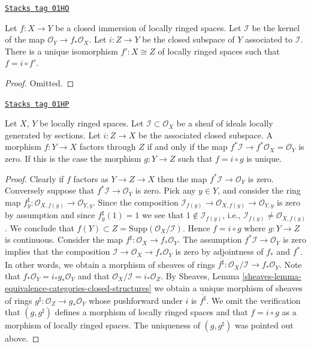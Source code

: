 \begin{lemma}
\label{schemes-lemma-closed-immersion}
\href{https://stacks.math.columbia.edu/tag/01HO}{\texttt{Stacks tag 01HO}}

Let $f : X \to Y$ be a closed immersion of
locally ringed spaces. Let $\mathcal{I}$ be the
kernel of the map $\mathcal{O}_Y \to f_*\mathcal{O}_X$.
Let $i : Z \to Y$ be the closed subspace of $Y$
associated to $\mathcal{I}$.
There is a unique isomorphism $f' : X \cong Z$ of
locally ringed spaces such that $f = i \circ f'$.
\end{lemma}

\begin{proof}
Omitted.
\end{proof}

\begin{lemma}
\label{schemes-lemma-characterize-closed-subspace}
\href{https://stacks.math.columbia.edu/tag/01HP}{\texttt{Stacks tag 01HP}}

Let $X$, $Y$ be locally ringed spaces. Let
$\mathcal{I} \subset \mathcal{O}_X$ be a sheaf of ideals locally generated
by sections. Let $i : Z \to X$ be the associated closed subspace.
A morphism $f : Y \to X$ factors through $Z$ if and only if the map
$f^*\mathcal{I} \to f^*\mathcal{O}_X = \mathcal{O}_Y$
is zero. If this is the case the morphism $g : Y \to Z$
such that $f = i \circ g$ is unique.
\end{lemma}

\begin{proof}
Clearly if $f$ factors as $Y \to Z \to X$ then the map
$f^*\mathcal{I} \to \mathcal{O}_Y$ is zero. Conversely
suppose that $f^*\mathcal{I} \to \mathcal{O}_Y$ is zero.
Pick any $y \in Y$, and consider the ring map
$f^\sharp_y : \mathcal{O}_{X, f(y)} \to \mathcal{O}_{Y, y}$.
Since the composition
$\mathcal{I}_{f(y)} \to \mathcal{O}_{X, f(y)} \to \mathcal{O}_{Y, y}$
is zero by assumption and since $f^\sharp_y(1) = 1$
we see that $1 \not \in \mathcal{I}_{f(y)}$, i.e.,
$\mathcal{I}_{f(y)} \not = \mathcal{O}_{X, f(y)}$. We conclude that
$f(Y) \subset Z = \text{Supp}(\mathcal{O}_X/\mathcal{I})$.
Hence $f = i \circ g$ where $g : Y \to Z$ is continuous.
Consider the map $f^\sharp : \mathcal{O}_X \to f_*\mathcal{O}_Y$.
The assumption $f^*\mathcal{I} \to \mathcal{O}_Y$ is zero implies that
the composition $\mathcal{I} \to \mathcal{O}_X \to f_*\mathcal{O}_Y$ is
zero by adjointness of $f_*$ and $f^*$.
In other words, we obtain a morphism of sheaves of rings
$\overline{f^\sharp} : \mathcal{O}_X/\mathcal{I} \to f_*\mathcal{O}_Y$.
Note that $f_*\mathcal{O}_Y = i_*g_*\mathcal{O}_Y$ and
that $\mathcal{O}_X/\mathcal{I} = i_*\mathcal{O}_Z$.
By Sheaves, Lemma \ref{sheaves-lemma-equivalence-categories-closed-structures}
we obtain a unique morphism of sheaves of rings
$g^\sharp : \mathcal{O}_Z \to g_*\mathcal{O}_Y$ whose pushforward
under $i$ is $\overline{f^\sharp}$. We omit the verification that
$(g, g^\sharp)$ defines a morphism of locally ringed spaces
and that $f = i \circ g$ as a morphism of locally ringed spaces.
The uniqueness of $(g, g^\sharp)$ was pointed out above.
\end{proof}

